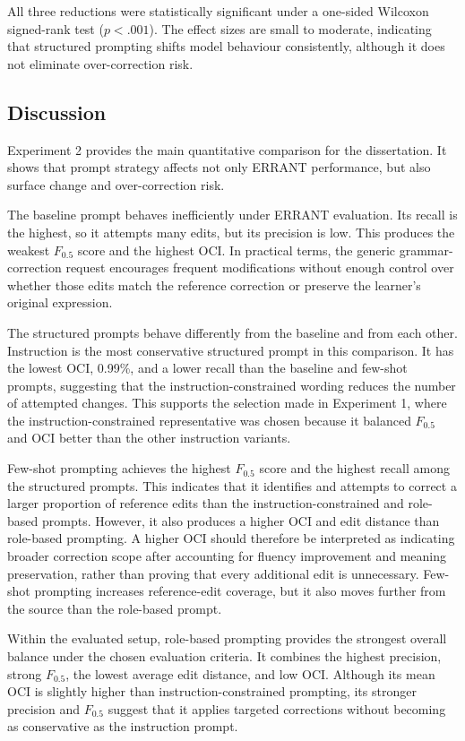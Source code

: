 All three reductions were statistically significant under a one-sided Wilcoxon signed-rank test ($p < .001$). The effect sizes are small to moderate, indicating that structured prompting shifts model behaviour consistently, although it does not eliminate over-correction risk.

\subsection{Discussion}

Experiment 2 provides the main quantitative comparison for the dissertation. It shows that prompt strategy affects not only ERRANT performance, but also surface change and over-correction risk.

The baseline prompt behaves inefficiently under ERRANT evaluation. Its recall is the highest, so it attempts many edits, but its precision is low. This produces the weakest $F_{0.5}$ score and the highest OCI. In practical terms, the generic grammar-correction request encourages frequent modifications without enough control over whether those edits match the reference correction or preserve the learner's original expression.

The structured prompts behave differently from the baseline and from each other. Instruction is the most conservative structured prompt in this comparison. It has the lowest OCI, 0.99\%, and a lower recall than the baseline and few-shot prompts, suggesting that the instruction-constrained wording reduces the number of attempted changes. This supports the selection made in Experiment 1, where the instruction-constrained representative was chosen because it balanced $F_{0.5}$ and OCI better than the other instruction variants.

Few-shot prompting achieves the highest $F_{0.5}$ score and the highest recall among the structured prompts. This indicates that it identifies and attempts to correct a larger proportion of reference edits than the instruction-constrained and role-based prompts. However, it also produces a higher OCI and edit distance than role-based prompting. A higher OCI should therefore be interpreted as indicating broader correction scope after accounting for fluency improvement and meaning preservation, rather than proving that every additional edit is unnecessary. Few-shot prompting increases reference-edit coverage, but it also moves further from the source than the role-based prompt.

Within the evaluated setup, role-based prompting provides the strongest overall balance under the chosen evaluation criteria. It combines the highest precision, strong $F_{0.5}$, the lowest average edit distance, and low OCI. Although its mean OCI is slightly higher than instruction-constrained prompting, its stronger precision and $F_{0.5}$ suggest that it applies targeted corrections without becoming as conservative as the instruction prompt.

